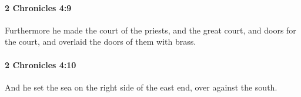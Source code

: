 		\paragraph{2 Chronicles 4:9} %
			\label{2CHRONICLES-4-9}

			Furthermore he made the court of the priests, and the great court, and doors for the court, and overlaid the doors of them with brass.


		\paragraph{2 Chronicles 4:10} %
			\label{2CHRONICLES-4-10}

			And he set the sea on the right side of the east end, over against the south.


